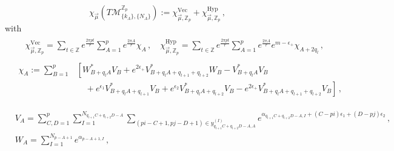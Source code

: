\documentclass[main.tex]{subfiles}
\begin{document}
\begin{subappendices}
\begin{equation}
\chi_{\vec{\mu}}\left(T\mathcal{M}_{\{k_A\},\{N_A\}}^{\mathbb{Z}_p}\right):=\chi_{\vec{\mu},\mathbb{Z}_p}^{\text{Vec}}+\chi_{\vec{\mu},\mathbb{Z}_p}^{\text{Hyp}}\,,
\end{equation}
with 
\begin{align}
&\begin{aligned}
&\chi_{\vec{\mu},\mathbb{Z}_p}^{\text{Vec}}=\sum_{t\in\mathbb{Z}}e^{\frac{2\pi pt}{r}}\sum_{A=1}^pe^{\frac{2\pi A}{r}}\chi_{A}\,,\quad \chi_{\vec{\mu},\mathbb{Z}_p}^{\text{Hyp}}=\sum_{t\in\mathbb{Z}}e^{\frac{2\pi pt}{r}}\sum_{A=1}^pe^{\frac{2\pi A}{r}}e^{m-\epsilon_+}\chi_{A+2q_l}\,,
\end{aligned}\\
&\begin{aligned}
\chi_{A}:=\sum_{B=1}^p&\left[W^*_{B+q_lA}V_B+e^{2\epsilon_+}V^*_{B+q_lA+q_{l+1}+q_{l+2}}W_B-V_{B+q_lA}^*V_{B}\right.\\
&\left.\quad+e^{\epsilon_1}V_{B+q_lA+q_{l+1}}^*V_{B}+e^{\epsilon_2}V_{B+q_lA+q_{l+2}}^*V_{B}-e^{2\epsilon_+}V_{B+q_lA+q_{l+1}+q_{l+2}}^*V_{B}\right]\,,
\end{aligned}
\end{align}

\begin{align}
&V_A=\sum_{C,D=1}^p\sum_{I=1}^{N_{q_{l+1}C+q_{l+2}D-A}}\sum_{(pi-C+1,pj-D+1)\in y_{q_{l+1}C+q_{l+2}D-A,A}^{(I)}}e^{\alpha_{q_{l+1}C+q_{l+2}D-A,I}+(C-pi)\epsilon_1+(D-pj)\epsilon_2}\,,\\
&W_A=\sum_{I=1}^{N_{p-A+1}}e^{\alpha_{p-A+1,I}}\,,
\end{align}



\end{subappendices}
\end{document}
